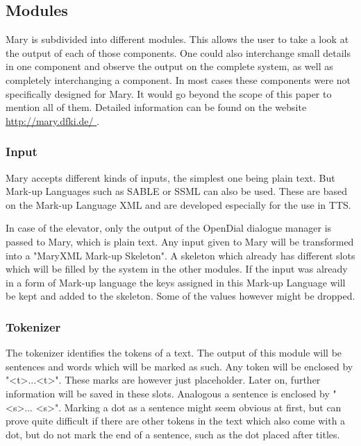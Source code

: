 \documentclass[a4paper, 12pt]{article}
\begin{document}
\subsection{Modules}

Mary is subdivided into different modules. 
This allows the user to take a look at the output of each of those components. 
One could also interchange small details in one component and observe the output on the complete system, as well as completely interchanging a component.
In most cases these components were not specifically designed for Mary. 
It would go beyond the scope of this paper to mention all of them. 
Detailed information can be found on the website \url{http://mary.dfki.de/ }.

\subsubsection*{Input}

Mary accepts different kinds of inputs, the simplest one being plain text.
But Mark-up Languages such as SABLE or SSML can also be used. 
These are based on the Mark-up Language XML and are developed especially for the use in TTS.

In case of the elevator, only the output of the OpenDial dialogue manager is passed to Mary, which is plain text.
Any input given to Mary will be transformed into a "MaryXML Mark-up Skeleton". 
A skeleton which already has different slots which will be filled by the system in the other modules.
If the input was already in a form of Mark-up language the keys assigned in this Mark-up Language will be kept and added to the skeleton. Some of the values however might be dropped.

\subsubsection*{Tokenizer}

The tokenizer identifies the tokens of a text. The output of this module will be sentences and words which will be marked as such.
Any token will be enclosed by "\textless t\textgreater ...\textless  t\textgreater". 
These marks are however just placeholder. 
Later on, further information will be saved in these slots.
Analogous a sentence is enclosed by "\textless s\textgreater ... \textless s\textgreater". 
Marking a dot as a sentence might seem obvious at first, but can prove quite difficult if there are other tokens in the text which also come with a dot, but do not mark the end of a sentence, such as the dot placed after titles.
\end{document}
